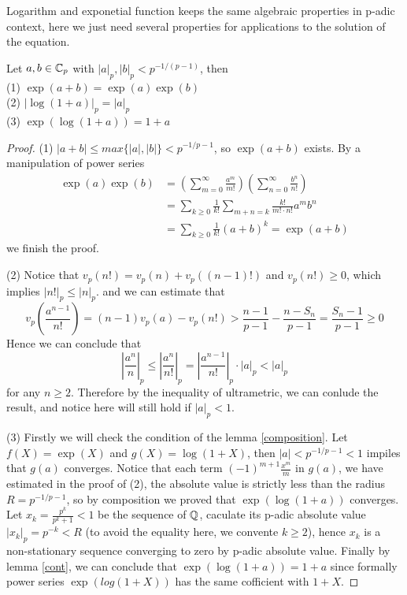 Logarithm and exponetial function keeps the same algebraic properties in p-adic context, here we just need several properties for applications to the solution of the equation.
\begin{proposition} \label{explog}
    Let \(a,b \in \mathbb{C}_p\) with \(|a|_p, |b|_p < p^{-1/(p-1)} \), then\\
    (1) \(\exp (a+b)  = \exp (a) \exp(b)\) \\
    (2) \(|\log(1+a)|_p = |a|_p\)\\
    (3) \(\exp (\log (1+a)) = 1+a\)
    \begin{proof}
        (1) \(|a+b|\leq max \{|a|,|b|\}<p^{-1/p-1}\), so \(\exp(a+b)\) exists. By a manipulation of power series
        \begin{align*}
           \exp(a)\exp(b) &= (\sum_{m=0}^{\infty}\frac{a^m}{m!})(\sum_{n=0}^{\infty}\frac{b^n}{n!}) \\
           &= \sum_{k\geq 0}\frac{1}{k!}\sum_{m+n=k}\frac{k!}{m!\cdot n!}a^mb^n\\
           &= \sum_{k\geq 0}\frac{1}{k!}(a+b)^k = \exp(a+b)
        \end{align*}
        we finish the proof.

        (2) Notice that \(v_p(n!)=v_p(n)+v_p((n-1)!)\) and \(v_p(n!)\geq 0\), which implies \(|n!|_p \leq |n|_p\). and we can estimate that
        \[v_p(\frac{a^{n-1}}{n!}) = (n-1)v_p(a)-v_p(n!) > \frac{n-1}{p-1} - \frac{n-S_n}{p-1} = \frac{S_n-1}{p-1} \geq 0\]
        Hence we can conclude that 
        \[|\frac{a^n}{n}|_p \leq |\frac{a^n}{n!}|_p = |\frac{a^{n-1}}{n!}|_p \cdot|a|_p < |a|_p\]        
        for any \(n \geq 2\). Therefore by the inequality of ultrametric, we can conlude the result, and notice here will still hold if \(|a|_{p} <1\).

        (3) Firstly we will check the condition of the lemma \ref{composition}. Let \(f(X) = \exp(X)\) and \(g(X) = \log(1+X)\), then \(|a| < p^{-1/p-1} <1\) impiles that \(g(a)\) converges. Notice that each term \((-1)^{m+1}\frac{x^m}{m}\) in \(g(a)\), we have estimated in the proof of (2), the absolute value is strictly less than the radius \(R = p^{-1/p-1}\), so by composition we proved that \(\exp(\log(1+a))\) converges. Let \(x_k = \frac{p^k}{p^k+1} <1\) be the sequence of \(\mathbb{Q}\), caculate its p-adic absolute value \(|x_k|_p=p^{-k} < R\) (to avoid the equality here, we convente \(k \geq 2\)), hence \(x_k\) is a non-stationary sequence converging to zero by p-adic absolute value. Finally by lemma \ref{cont}, we can conclude that \( \exp(\log(1+a)) = 1+a\) since formally power series \(\exp(log(1+X))\) has the same cofficient with \(1+X\).

    \end{proof}
\end{proposition}

